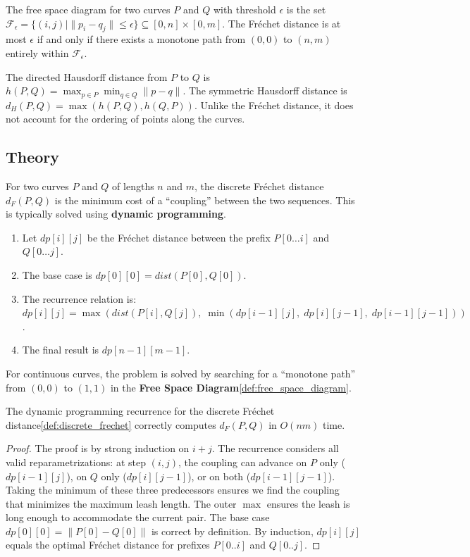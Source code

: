 \begin{definition}\label{def:free_space_diagram}
The free space diagram for two curves $P$ and $Q$ with threshold $\epsilon$ is the set $\mathcal{F}_\epsilon = \{(i,j) \mid \|p_i - q_j\| \le \epsilon\} \subseteq [0,n] \times [0,m]$. The Fr\'{e}chet distance is at most $\epsilon$ if and only if there exists a monotone path from $(0,0)$ to $(n,m)$ entirely within $\mathcal{F}_\epsilon$.
\end{definition}

\begin{definition}\label{def:hausdorff}
The directed Hausdorff distance from $P$ to $Q$ is $h(P,Q) = \max_{p \in P} \min_{q \in Q} \|p - q\|$. The symmetric Hausdorff distance is $d_H(P,Q) = \max(h(P,Q), h(Q,P))$. Unlike the Fr\'{e}chet distance, it does not account for the ordering of points along the curves.
\end{definition}

\subsection{Theory}
For two curves $P$ and $Q$ of lengths $n$ and $m$, the discrete Fr\'{e}chet distance $d_F(P, Q)$ is the minimum cost of a ``coupling'' between the two sequences. This is typically solved using \textbf{dynamic programming}.
\begin{enumerate}
  \item Let $dp[i][j]$ be the Fr\'{e}chet distance between the prefix $P[0 \dots i]$ and $Q[0 \dots j]$.
  \item The base case is $dp[0][0] = dist(P[0], Q[0])$.
  \item The recurrence relation is:
  $dp[i][j] = \max(dist(P[i], Q[j]),\; \min(dp[i-1][j],\; dp[i][j-1],\; dp[i-1][j-1]))$.
  \item The final result is $dp[n-1][m-1]$.
\end{enumerate}

For continuous curves, the problem is solved by searching for a ``monotone path'' from $(0,0)$ to $(1,1)$ in the \textbf{Free Space Diagram}\cref{def:free_space_diagram}.

\begin{theorem}\label{thm:frechet_dp_correctness}
The dynamic programming recurrence for the discrete Fr\'{e}chet distance\cref{def:discrete_frechet} correctly computes $d_F(P,Q)$ in $O(nm)$ time.
\end{theorem}
\begin{proof}
The proof is by strong induction on $i+j$. The recurrence considers all valid reparametrizations: at step $(i,j)$, the coupling can advance on $P$ only ($dp[i-1][j]$), on $Q$ only ($dp[i][j-1]$), or on both ($dp[i-1][j-1]$). Taking the minimum of these three predecessors ensures we find the coupling that minimizes the maximum leash length. The outer $\max$ ensures the leash is long enough to accommodate the current pair. The base case $dp[0][0] = \|P[0]-Q[0]\|$ is correct by definition. By induction, $dp[i][j]$ equals the optimal Fr\'{e}chet distance for prefixes $P[0..i]$ and $Q[0..j]$.
\end{proof}

